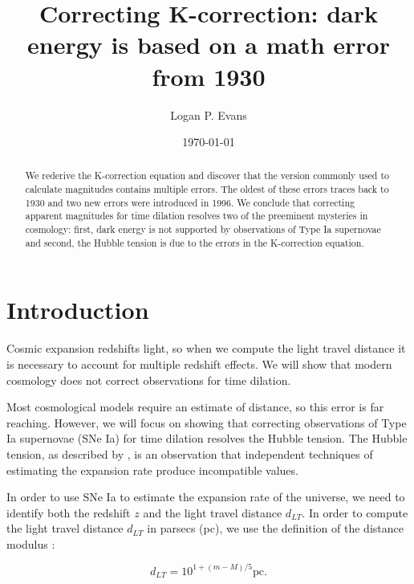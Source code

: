 \title{Correcting K-correction: dark energy is based on a math error from 1930}

\author{Logan P. Evans}
 \noaffiliation

\date{\today}

\begin{abstract}
We rederive the K-correction equation and discover that the version commonly
used to calculate magnitudes contains multiple errors. The oldest of these
errors traces back to 1930 and two new errors were introduced in 1996. We
conclude that correcting apparent magnitudes for time dilation resolves two of
the preeminent mysteries in cosmology: first, dark energy is not supported by
observations of Type Ia supernovae and second, the Hubble tension is due to the
errors in the K-correction equation.
\end{abstract}

\maketitle

\section{Introduction}

Cosmic expansion redshifts light, so when we compute the light travel distance
it is necessary to account for multiple redshift effects. We will show that
modern cosmology does not correct observations for time dilation.

Most cosmological models require an estimate of distance, so this error is far
reaching. However, we will focus on showing that correcting observations of
Type Ia supernovae (SNe Ia) for time dilation resolves the Hubble tension. The
Hubble tension, as described by \citet{verde2019}, is an observation that
independent techniques of estimating the expansion rate produce incompatible
values.

In order to use SNe Ia to estimate the expansion rate of the universe, we need
to identify both the redshift $z$ and the light travel distance $d_{LT}$. In
order to compute the light travel distance $d_{LT}$ in parsecs (pc), we use the
definition of the distance modulus \citep{weinberg2008}:

\begin{equation}
\label{eq:mu_def}
  d_{LT} = 10^{1 + (m - M)/5} \text{pc}.
\end{equation}

